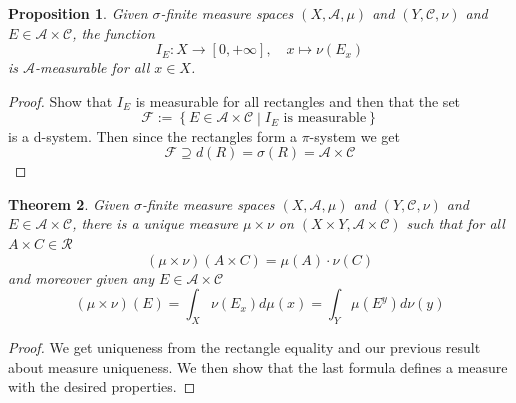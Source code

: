 \documentclass[11pt]{article}
\newcommand{\defeq}{:=}
\newcommand{\relmiddle}[1]{\mathrel{}\middle#1\mathrel{}}
\newcommand{\rmv}{\relmiddle|}
\newtheorem{theorem}{Theorem}[section]
\newtheorem{prop}[theorem]{Proposition}
\begin{document}
\begin{prop}
Given $\sigma$-finite measure spaces $(X, \mathcal{A}, \mu)$ and $(Y, \mathcal{C}, \nu)$ and $E\in\mathcal{A}\times \mathcal{C}$, the function 
\[
	I_E:X\to [0, +\infty], \quad x\mapsto \nu(E_x)
\]
is $\mathcal{A}$-measurable for all $x\in X$.
\end{prop}
\begin{proof}
Show that $I_E$ is measurable for all rectangles and then that the set
\[
	\mathcal{F}\defeq\left\{E\in\mathcal{A}\times\mathcal{C} \rmv I_E \text{ is measurable}\right\}
\]
is a d-system.
Then since the rectangles form a $\pi$-system we get
\[
	\mathcal{F}\supseteq d(R) = \sigma(R) = \mathcal{A}\times\mathcal{C}
\]
\end{proof}
\begin{theorem}
Given $\sigma$-finite measure spaces $(X, \mathcal{A}, \mu)$ and $(Y, \mathcal{C}, \nu)$ and $E\in\mathcal{A}\times \mathcal{C}$, there is a unique measure $\mu\times\nu$ on $(X\times Y, \mathcal{A}\times\mathcal{C})$ such that for all $A\times C\in \mathcal{R}$
\[
	(\mu \times \nu)(A\times C)=\mu(A)\cdot\nu(C)
\]
and moreover given any $E\in\mathcal{A}\times\mathcal{C}$
\[
	(\mu\times\nu)(E)=\int_X \nu(E_x)d\mu(x) = \int_Y \mu(E^y)d\nu(y)
\]
\end{theorem}
\begin{proof}
We get uniqueness from the rectangle equality and our previous result about measure uniqueness.
We then show that the last formula defines a measure with the desired properties.
\end{proof}
\end{document}
